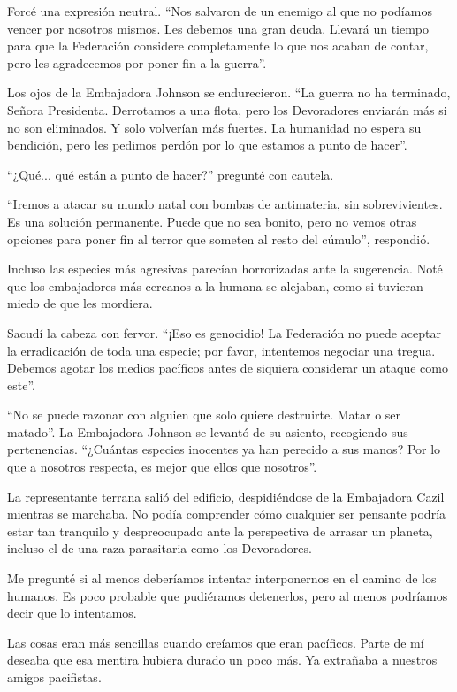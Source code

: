 \documentclass[spanish,12pt,a4paper,oneside,titlepage]{book}
\begin{document}
    Forcé una expresión neutral. ``Nos salvaron de un enemigo al que no podíamos vencer por nosotros mismos. Les debemos una gran deuda. Llevará un tiempo para que la Federación considere completamente lo que nos acaban de contar, pero les agradecemos por poner fin a la guerra''.

    Los ojos de la Embajadora Johnson se endurecieron. ``La guerra no ha terminado, Señora Presidenta. Derrotamos a una flota, pero los Devoradores enviarán más si no son eliminados. Y solo volverían más fuertes. La humanidad no espera su bendición, pero les pedimos perdón por lo que estamos a punto de hacer''.

    ``¿Qué... qué están a punto de hacer?'' pregunté con cautela.

    ``Iremos a atacar su mundo natal con bombas de antimateria, sin sobrevivientes. Es una solución permanente. Puede que no sea bonito, pero no vemos otras opciones para poner fin al terror que someten al resto del cúmulo'', respondió.

    Incluso las especies más agresivas parecían horrorizadas ante la sugerencia. Noté que los embajadores más cercanos a la humana se alejaban, como si tuvieran miedo de que les mordiera.

    Sacudí la cabeza con fervor. ``¡Eso es genocidio! La Federación no puede aceptar la erradicación de toda una especie; por favor, intentemos negociar una tregua. Debemos agotar los medios pacíficos antes de siquiera considerar un ataque como este''.

    ``No se puede razonar con alguien que solo quiere destruirte. Matar o ser matado''. La Embajadora Johnson se levantó de su asiento, recogiendo sus pertenencias. ``¿Cuántas especies inocentes ya han perecido a sus manos? Por lo que a nosotros respecta, es mejor que ellos que nosotros''.

    La representante terrana salió del edificio, despidiéndose de la Embajadora Cazil mientras se marchaba. No podía comprender cómo cualquier ser pensante podría estar tan tranquilo y despreocupado ante la perspectiva de arrasar un planeta, incluso el de una raza parasitaria como los Devoradores.

    Me pregunté si al menos deberíamos intentar interponernos en el camino de los humanos. Es poco probable que pudiéramos detenerlos, pero al menos podríamos decir que lo intentamos.

    Las cosas eran más sencillas cuando creíamos que eran pacíficos. Parte de mí deseaba que esa mentira hubiera durado un poco más. Ya extrañaba a nuestros amigos pacifistas.
\end{document}
